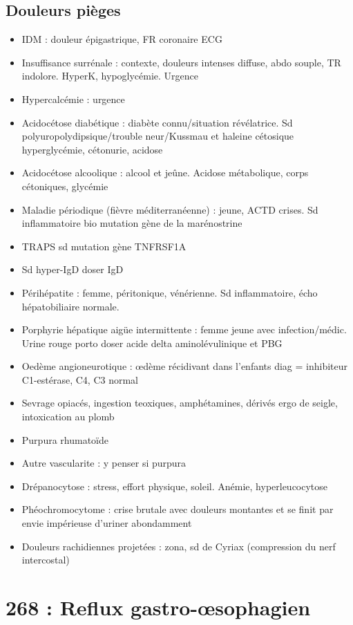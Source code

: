 \documentclass[11pt]{article}
\begin{document}
\subsection{Douleurs pièges}
\label{sec:orgc1b1e69}
\begin{itemize}
\item IDM : douleur épigastrique, FR coronaire \thus ECG
\item Insuffisance surrénale : contexte, douleurs intenses diffuse, abdo souple, TR
indolore. HyperK, hypoglycémie. Urgence 
\item Hypercalcémie : urgence 
\item Acidocétose diabétique : diabète connu/situation révélatrice. Sd
polyuropolydipsique/trouble neur/Kussmau et haleine cétosique \thus
hyperglycémie, cétonurie, acidose
\item Acidocétose alcoolique : alcool et jeûne. Acidose métabolique, \inc corps
cétoniques, glycémie \dec
\item Maladie périodique (fièvre méditerranéenne) : jeune, ACTD crises. Sd
inflammatoire bio \thus mutation gène de la marénostrine
\item TRAPS sd \thus mutation gène TNFRSF1A
\item Sd hyper-IgD \thus doser IgD
\item Périhépatite : femme, péritonique, vénérienne. Sd inflammatoire, écho
hépatobiliaire normale.
\item Porphyrie hépatique aigüe intermittente : femme jeune avec
infection/médic. Urine rouge porto \thus doser acide delta aminolévulinique et PBG
\item Oedème angioneurotique : \oe{}dème récidivant dans l'enfants \thus diag = \dec
inhibiteur C1-estérase, C4, C3 normal
\item Sevrage opiacés, ingestion teoxiques, amphétamines, dérivés ergo de seigle,
intoxication au plomb
\item Purpura rhumatoïde
\item Autre vascularite : y penser si purpura
\item Drépanocytose : stress, effort physique, soleil. Anémie, hyperleucocytose
\item Phéochromocytome : crise brutale avec douleurs montantes et se finit par envie
impérieuse d'uriner abondamment
\item Douleurs rachidiennes projetées : zona, sd de Cyriax (compression du nerf intercostal)
\end{itemize}

\section{268 : Reflux gastro-\oe{}sophagien}
\label{sec:orgb56dc4c}
\end{document}
